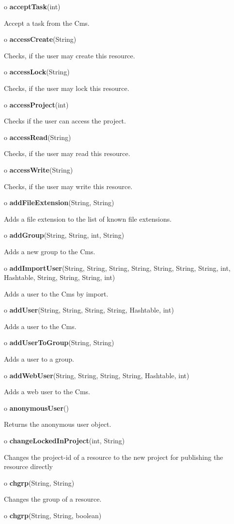 \begin{description}
\item o {\bf acceptTask}(int)

Accept a task from the Cms.
\item o {\bf accessCreate}(String)

Checks, if the user may create this resource.
\item o {\bf accessLock}(String)

Checks, if the user may lock this resource.
\item o {\bf accessProject}(int)

Checks if the user can access the project.
\item o {\bf accessRead}(String)

Checks, if the user may read this resource.
\item o {\bf accessWrite}(String)

Checks, if the user may write this resource.
\item o {\bf addFileExtension}(String, String)

Adds a file extension to the list of known file extensions.
\item o {\bf addGroup}(String, String, int, String)

Adds a new group to the Cms.
\item o {\bf addImportUser}(String, String, String, String, String, String,
String, int, Hashtable, String, String, String, int)

Adds a user to the Cms by import.
\item o {\bf addUser}(String, String, String, String, Hashtable, int)

Adds a user to the Cms.
\item o {\bf addUserToGroup}(String, String)

Adds a user to a group.
\item o {\bf addWebUser}(String, String, String, String, Hashtable, int)

Adds a web user to the Cms.
\item o {\bf anonymousUser}()

Returns the anonymous user object.
\item o {\bf changeLockedInProject}(int, String)

Changes the project-id of a resource to the new project for publishing the
resource directly
\item o {\bf chgrp}(String, String)

Changes the group of a resource.
\item o {\bf chgrp}(String, String, boolean)


\end{description}
